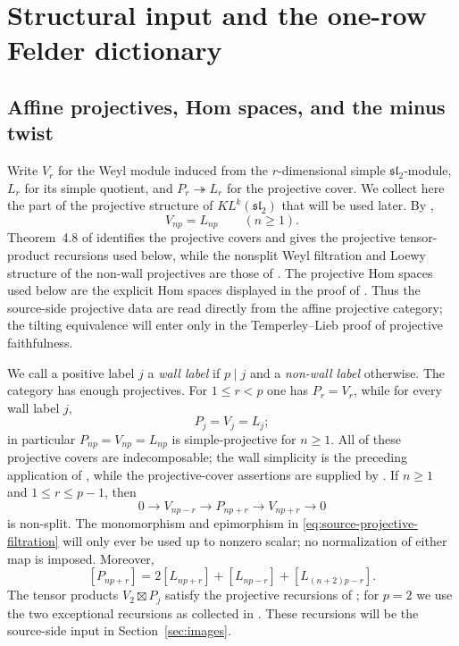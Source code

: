 \documentclass[12pt,leqno]{amsart}
\numberwithin{equation}{section}
\newcommand{\KL}{KL}
\begin{document}
\section{Structural input and the one-row Felder dictionary}\label{sec:prelim}

\subsection{Affine projectives, Hom spaces, and the minus twist}

Write $V_r$ for the Weyl module induced from the $r$-dimensional simple
$\mathfrak{sl}_2$-module, $L_r$ for its simple quotient, and
$P_r\twoheadrightarrow L_r$ for the projective cover.  We collect here the
part of the projective structure of $\KL^k(\mathfrak{sl}_2)$ that will be
used later.  By \cite[Theorem~2.2]{McRaeYang},
\[
 V_{np}=L_{np}\qquad(n\ge1).
\]
Theorem~4.8 of \cite{McRaeYang} identifies the projective covers and gives
the projective tensor-product recursions used below, while the nonsplit
Weyl filtration and Loewy structure of the non-wall projectives are those
of \cite[Theorem~4.4]{McRaeYang}.  The projective Hom spaces used below
are the explicit Hom spaces displayed in the proof of
\cite[Theorem~6.6]{McRaeYang}.  Thus the source-side projective data are
read directly from the affine projective category; the tilting equivalence
will enter only in the Temperley--Lieb proof of projective faithfulness.

We call a positive label $j$ a \emph{wall label} if $p\mid j$ and a
\emph{non-wall label} otherwise.  The category has enough projectives.
For $1\leq r<p$ one has $P_r=V_r$, while for every wall label $j$,
\[
 P_j=V_j=L_j;
\]
in particular $P_{np}=V_{np}=L_{np}$ is simple-projective for $n\geq1$.
All of these projective covers are indecomposable; the wall simplicity
is the preceding application of \cite[Theorem~2.2]{McRaeYang}, while the
projective-cover assertions are supplied by \cite[Theorem~4.8]{McRaeYang}.
If $n\geq1$ and $1\leq r\leq p-1$, then
\begin{equation}\label{eq:source-projective-filtration}
 0\longrightarrow V_{np-r}\longrightarrow P_{np+r}
 \longrightarrow V_{np+r}\longrightarrow0
\end{equation}
is non-split.  The monomorphism and epimorphism in
\eqref{eq:source-projective-filtration} will only ever be used up to
nonzero scalar; no normalization of either map is imposed.  Moreover,
\begin{equation}\label{eq:source-composition-factors}
 [P_{np+r}]
 =2[L_{np+r}]+[L_{np-r}]+[L_{(n+2)p-r}].
\end{equation}
The tensor products $V_2\boxtimes P_j$ satisfy the projective recursions of
\cite[Theorem~4.8]{McRaeYang}; for $p=2$ we use the two exceptional
recursions as collected in \cite[Theorem~1.4(1)]{McRaeYang}.  These recursions will be the source-side input in
Section~\ref{sec:images}.
\end{document}
